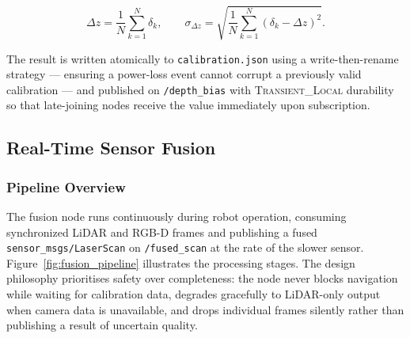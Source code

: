 \begin{equation}
    \Delta z = \frac{1}{N}\sum_{k=1}^{N}\delta_{k},
    \qquad
    \sigma_{\Delta z} =
        \sqrt{\frac{1}{N}\sum_{k=1}^{N}(\delta_{k}-\Delta z)^{2}}.
    \label{eq:bias}
\end{equation}

The result is written atomically to \texttt{calibration.json} using a
write-then-rename strategy — ensuring a power-loss event cannot corrupt
a previously valid calibration — and published on \texttt{/depth\_bias}
with \textsc{Transient\_Local} durability so that late-joining nodes
receive the value immediately upon subscription.

\subsection{Real-Time Sensor Fusion}

\subsubsection{Pipeline Overview}

The fusion node runs continuously during robot operation, consuming
synchronized LiDAR and RGB-D frames and publishing a fused
\texttt{sensor\_msgs/LaserScan} on \texttt{/fused\_scan} at the rate
of the slower sensor. Figure~\ref{fig:fusion_pipeline} illustrates the
processing stages. The design philosophy prioritises safety over
completeness: the node never blocks navigation while waiting for
calibration data, degrades gracefully to LiDAR-only output when camera
data is unavailable, and drops individual frames silently rather than
publishing a result of uncertain quality.

